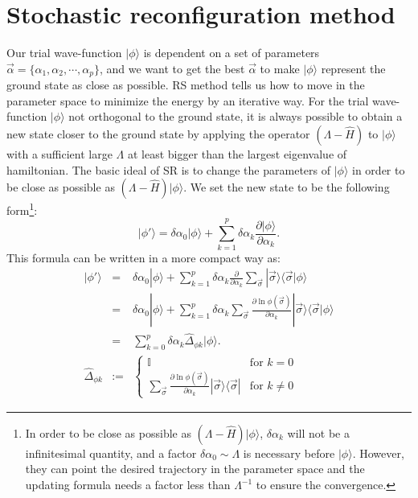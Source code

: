 \documentclass[letterpaper, 10pt]{article}
\newcommand{\qbar}{\rangle}
\newcommand{\qket}{\langle}
\begin{document}
\section{Stochastic reconfiguration method}
Our trial wave-function $|\phi\qbar$ is dependent on a set of parameters $\vec{\alpha} = \{ \alpha_1, \alpha_2, \cdots, \alpha_p \}$, and we want to get the best $\vec{\alpha}$ to make $|\phi\qbar$ represent the ground state as close as possible. RS method tells us how to move in the parameter space to minimize the energy by an iterative way. For the trial wave-function $|\phi\qbar$ not orthogonal to the ground state, it is always possible to obtain a new state closer to the ground state by applying the operator $(\Lambda - \hat{H})$ to $|\phi\qbar$ with a sufficient large $\Lambda$ at least bigger than the largest eigenvalue of hamiltonian. The basic ideal of SR is to change the parameters of $|\phi\qbar$ in order to be close as possible as $(\Lambda - \hat{H})|\phi\qbar$. We set the new state to be the following form\footnote{In order to be close as possible as $(\Lambda - \hat{H})|\phi\qbar$, $\delta \alpha_k$ will not be a infinitesimal quantity, and a factor $\delta \alpha_0 \sim \Lambda$ is necessary before $|\phi\qbar$. However, they can point the desired trajectory in the parameter space and the updating formula needs a factor less than $\Lambda^{-1}$ to ensure the convergence.}:
\[ |\phi' \qbar = \delta\alpha_0 |\phi\qbar + \sum_{k=1}^p \delta\alpha_k \frac{\partial |\phi\qbar}{\partial \alpha_k}. \]
This formula can be written in a more compact way as:
\begin{eqnarray*}
|\phi'\qbar & = & \delta\alpha_0 |\phi\qbar + \sum_{k=1}^p \delta\alpha_k \frac{\partial}{\partial \alpha_k} \sum_{\vec{\sigma}} |\vec{\sigma}\qbar\qket\vec{\sigma}|\phi\qbar\\
                 & = & \delta\alpha_0 |\phi\qbar + \sum_{k=1}^p \delta\alpha_k \sum_{\vec{\sigma}} \frac{\partial \ln \phi(\vec{\sigma})}{\partial \alpha_k} |\vec{\sigma}\qbar\qket\vec{\sigma}|\phi\qbar\\
                 & = & \sum_{k=0}^p \delta\alpha_k \hat{\Delta}_{\phi k} |\phi\qbar.\\
\hat{\Delta}_{\phi k} & := & \begin{cases} \mathbb{I} & \text{for } k = 0\\ \sum_{\vec{\sigma}} \frac{\partial \ln \phi(\vec{\sigma})}{\partial \alpha_k} |\vec{\sigma}\qbar\qket\vec{\sigma}| & \text{for } k \neq 0 \end{cases}
\end{eqnarray*}
\end{document}
